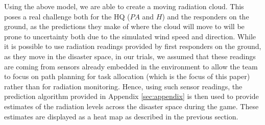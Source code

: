 Using the above model, we are able to create a moving radiation cloud. This poses a real challenge both for the HQ ($PA$ and $H$) and the responders on the ground, as the predictions they make of where the cloud will move to will be prone to uncertainty both due to the simulated wind speed and direction.  While it is possible to use radiation readings provided by first responders on the ground, as they move in the disaster space, in our trials, we assumed that these readings are coming from sensors already embedded in the environment to allow the team to focus on path planning for task allocation (which is the focus of this paper) rather than for radiation monitoring. Hence, using such sensor readings, the prediction algorithm provided in Appendix \ref{sec:appendix} is then used to provide estimates of the radiation levels across  the disaster space during the game. These estimates are displayed as a heat map as described in the previous section.

